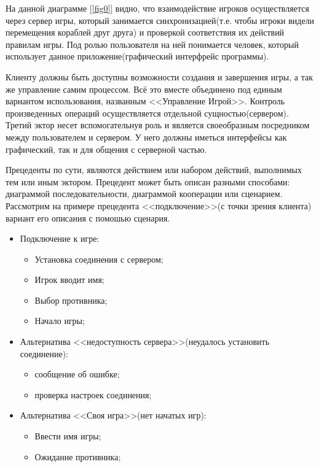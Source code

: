 На данной диаграмме [\ref{fig0}] видно, что взаимодействие игроков осуществляется через сервер игры, который
занимается синхронизацией(т.е. чтобы игроки видели перемещения кораблей друг друга)
и проверкой соответствия их действий правилам игры. Под ролью пользователя на ней понимается 
человек, который использует данное приложение(графический интерфрейс программы).

Клиенту должны быть доступны возможности создания и завершения игры, а так же управление самим процессом. Всё это вместе объединено под единым вариантом использования, названным <<Управление Игрой>>. Контроль произведенных операций осуществляется отдельной сущностью(сервером). Третий эктор несет вспомогательнуя роль и является своеобразным посредником между пользователем и сервером. У него должны иметься интерфейсы как графический, так и для общения с серверной частью. 

Прецеденты по сути, являются действием или набором действий, выполнимых тем или иным эктором. Прецедент может быть описан разными способами: диаграммой последовательности, диаграммой кооперации или сценарием.
Рассмотрим на примере прецедента <<подключение>>(с точки зрения клиента) вариант его описания с помошью сценария.

\begin{itemize}
	\item Подключение к игре:
	\begin{itemize}
		\item Установка соединения с сервером;
		\item Игрок вводит имя;
		\item Выбор противника;
		\item Начало игры;
  	\end{itemize} 
	\item Альтернатива <<недоступность сервера>>(неудалось установить соединение): 
	\begin{itemize}
		\item сообщение об ошибке;
		\item проверка настроек соединения;
  	\end{itemize} 
	\item Альтернатива <<Своя игра>>(нет начатых игр):
	\begin{itemize}
		\item Ввести имя игры;
		\item Ожидание противника;
  	\end{itemize} 
\end{itemize} 

